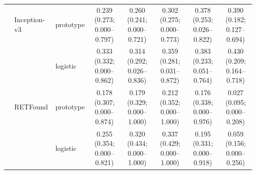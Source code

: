 \begin{tabular}{@{}lll*{5}{c}@{}}
 & Inception-v3 & prototype & \makecell{0.239\\{\scriptsize (0.273; 0.000--0.797)}} & \makecell{0.260\\{\scriptsize (0.241; 0.000--0.721)}} & \makecell{0.302\\{\scriptsize (0.275; 0.000--0.773)}} & \makecell{0.378\\{\scriptsize (0.253; 0.026--0.822)}} & \makecell{0.390\\{\scriptsize (0.182; 0.127--0.694)}} \\
 &  & logistic & \makecell{0.333\\{\scriptsize (0.332; 0.000--0.862)}} & \makecell{0.314\\{\scriptsize (0.292; 0.026--0.836)}} & \makecell{0.359\\{\scriptsize (0.281; 0.031--0.872)}} & \makecell{0.383\\{\scriptsize (0.233; 0.051--0.764)}} & \makecell{0.430\\{\scriptsize (0.209; 0.164--0.718)}} \\
 & RETFound & prototype & \makecell{0.178\\{\scriptsize (0.307; 0.000--0.874)}} & \makecell{0.179\\{\scriptsize (0.329; 0.000--1.000)}} & \makecell{0.212\\{\scriptsize (0.352; 0.000--1.000)}} & \makecell{0.176\\{\scriptsize (0.338; 0.000--0.976)}} & \makecell{0.027\\{\scriptsize (0.095; 0.000--0.208)}} \\
 &  & logistic & \makecell{0.255\\{\scriptsize (0.354; 0.000--0.821)}} & \makecell{0.320\\{\scriptsize (0.434; 0.000--1.000)}} & \makecell{0.337\\{\scriptsize (0.429; 0.000--1.000)}} & \makecell{0.195\\{\scriptsize (0.331; 0.000--0.918)}} & \makecell{0.059\\{\scriptsize (0.156; 0.000--0.256)}} \\
\bottomrule
\end{tabular}

